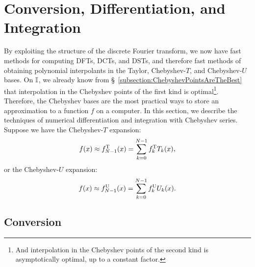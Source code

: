 \section{Conversion, Differentiation, and Integration}

By exploiting the structure of the discrete Fourier transform, we now have fast methods for computing DFTs, DCTs, and DSTs, and therefore fast methods of obtaining polynomial interpolants in the Taylor, Chebyshev-$T$, and Chebyshev-$U$ bases. On $\mathbb{I}$, we already know from \S~\ref{subsection:ChebyshevPointsAreTheBest} that interpolation in the Chebyshev points of the first kind is optimal\footnote{And interpolation in the Chebyshev points of the second kind is asymptotically optimal, up to a constant factor.}. Therefore, the Chebyshev bases are the most practical ways to store an approximation to a function $f$ on a computer. In this section, we describe the techniques of numerical differentiation and integration with Chebyshev series. Suppose we have the Chebyshev-$T$ expansion:
\begin{equation}\label{eq:ChebyshevTExpansion}
f(x) \approx f_{N-1}^{\rm T}(x) = \sum_{k=0}^{N-1} f_k^{\rm T} T_k(x),
\end{equation}
or the Chebyshev-$U$ expansion:
\begin{equation}\label{eq:ChebyshevUExpansion}
f(x) \approx f_{N-1}^{\rm U}(x) = \sum_{k=0}^{N-1} f_k^{\rm U} U_k(x).
\end{equation}

\subsection{Conversion}

